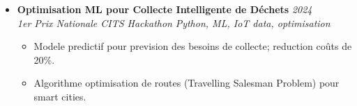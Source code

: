 \documentclass[a4paper,11pt]{article}
\begin{document}
\begin{itemize}[leftmargin=*, label={-}]
\item \textbf{Optimisation ML pour Collecte Intelligente de D\'echets} \hfill \textit{2024} \\
\textit{1er Prix Nationale CITS Hackathon} \hfill \textit{Python, ML, IoT data, optimisation}
\vspace{-2pt}
    \begin{itemize}[leftmargin=0.4cm, nosep, label=\tiny$\bullet$]
        \item \small{Modele predictif pour prevision des besoins de collecte; reduction coûts de 20\%.}
        \item \small{Algorithme optimisation de routes (Travelling Salesman Problem) pour smart cities.}
    \end{itemize}

\end{itemize}
\end{document}
